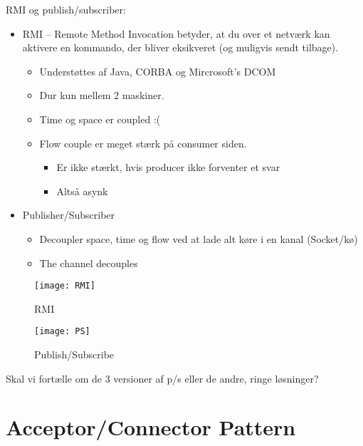 \documentclass{article}
\begin{document}
RMI og publish/subscriber:
\begin{itemize}
	\item RMI -- Remote Method Invocation betyder, at du over et netværk kan aktivere en kommando, der bliver eksikveret (og muligvis sendt tilbage).

	\begin{itemize}
	 	\item Understøttes af Java, CORBA og Mircrosoft's DCOM
	 	\item Dur kun mellem 2 maskiner.
		\item Time og space er coupled :(
		\item Flow couple er meget stærk på consumer siden.
		\begin{itemize}
		 	\item Er ikke stærkt, hvis producer ikke forventer et svar
		 	\item Altså asynk
		 \end{itemize} 
	\end{itemize} 

	\item Publisher/Subscriber
	\begin{itemize}
		\item Decoupler space, time og flow ved at lade alt køre i en kanal (Socket/kø)
		\item The channel decouples
	\end{itemize}
\end{itemize}

\begin{figure}[ht]
\begin{minipage}[b]{0.45\linewidth}
\centering
\texttt{[image: RMI]}
\caption{RMI}
\label{fig:figure1}
\end{minipage} 						%
\hspace{0.5cm}						%
\begin{minipage}[b]{0.45\linewidth}	%
\centering
\texttt{[image: PS]}
\caption{Publish/Subscribe}
\label{fig:figure2}
\end{minipage}
\end{figure}


Skal vi fortælle om de 3 versioner af p/s eller de andre, ringe løsninger?









\newpage
\section{Acceptor/Connector Pattern}
\end{document}
